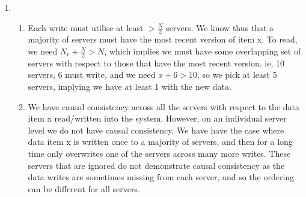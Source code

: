\documentclass{article}
\begin{document}
\begin{enumerate}
\begin{enumerate}
	\end{enumerate}

	\item  

	\begin{enumerate}

		\item 
Each write must utilise at least \( > \frac{N}{2}\) servers. We know thus that a majority of servers must have the most recent version of item x. To read, we need \( N_r + \frac{N}{2} > N \), which implies we must have some overlapping set of servers with respect to those that have the most recent version. ie, 10 servers, 6 must write, and we need \(x + 6 > 10\), so we pick at least 5 servers, implying we have at least 1 with the new data.

		\item 
We have causal consistency across all the servers with respect to the data item x read/written into the system. However, on an individual server level we do not have causal consistency. We have have the case where data item x is written once to a majority of servers, and then for a long time only overwrites one of the servers across many more writes. These servers that are ignored do not demonstrate causal consistency as the data writes are sometimes missing from each server, and so the ordering can be different for all servers.

	\end{enumerate}

\end{enumerate}
\end{document}
